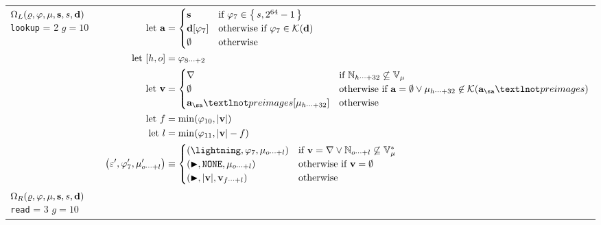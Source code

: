 \begin{longtable}{p{3.5cm} p{12.5cm}}
  \cmidrule(lr){1-1}\cmidrule(lr){2-2}
  \makecell*[l]{
  $\Omega_L(\varrho, \varphi, \mu, \mathbf{s}, s, \mathbf{d})$ \\
  \texttt{lookup} = 2 \\
  $g = 10$} &
  $\begin{aligned}
    \using \mathbf{a} &= \begin{cases}
      \mathbf{s} &\when \registers_7 \in \set{ s, 2^{64} - 1 } \\
      \mathbf{d}[\registers_7] &\otherwhen \registers_7 \in \keys{\mathbf{d}} \\
      \none &\otherwise
    \end{cases} \\
    \using \sq{h, o} &= \registers\subrange{8}{2} \\
    \using \mathbf{v} &= \begin{cases}
      \error &\when \Nrange{h}{32} \not\subseteq \readable{\memory} \\
      \none &\otherwhen \mathbf{a} = \none \vee \memory\subrange{h}{32} \not\in \keys{\mathbf{a}_\sa¬preimages} \\
      \mathbf{a}_\sa¬preimages[\memory\subrange{h}{32}] &\otherwise \\
    \end{cases} \\
    \using f &= \min(\registers_{10}, \len{\mathbf{v}}) \\
    \using l &= \min(\registers_{11}, \len{\mathbf{v}} - f) \\
    \tup{\execst', \registers'_7, \memory'\subrange{o}{l}} &\equiv \begin{cases}
      \tup{\panic, \registers_7, \memory\subrange{o}{l}} &\when \mathbf{v} = \error \vee \Nrange{o}{l} \not\subseteq \writable{\memory}\\
      \tup{\continue, \mathtt{NONE}, \memory\subrange{o}{l}} &\otherwhen \mathbf{v} = \none \\
      \tup{\continue, \len{\mathbf{v}}, \mathbf{v}\subrange{f}{l}} &\otherwise \\
    \end{cases}
  \end{aligned}$\\
  \cmidrule(lr){1-1}\cmidrule(lr){2-2}
  \makecell*[l]{
  $\Omega_R(\varrho, \varphi, \mu, \mathbf{s}, s, \mathbf{d})$ \\
  \texttt{read} = 3 \\
  $g = 10$} &

\end{longtable}
